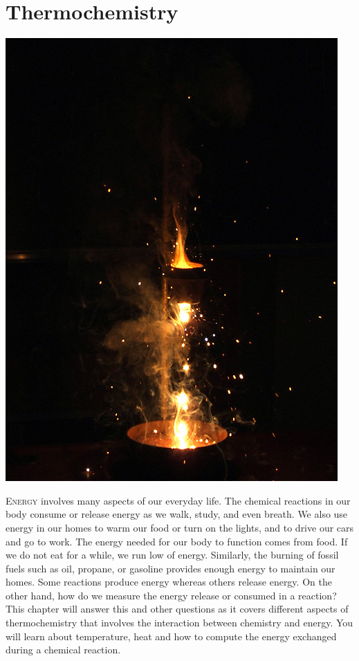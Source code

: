 \documentclass[main.tex]{subfiles}
\begin{document}
\linenumbers



\chapter[Thermochemistry]{Thermochemistry}
\label{ch:energy}

\begin{marginfigure}
      \includegraphics{chapter2/figure1}
   \end{marginfigure}
\lettrine[lines=4]{\color{black!45}E}{nergy}  involves many aspects of our everyday life. The chemical reactions in our body consume or release energy as we walk, study, and even breath. We also use energy in our homes to warm our food or turn on the lights, and to drive our cars and go to work. The energy needed for our body to function comes from food. If we do not eat for a while, we run low of energy. Similarly, the burning of fossil fuels such as oil, propane, or gasoline provides enough energy to maintain our homes. Some reactions produce energy whereas others release energy. On the other hand, how do we measure the energy release or consumed in a reaction? This chapter will answer this and other questions as it covers different aspects of thermochemistry that involves the interaction between chemistry and energy. You will learn about temperature, heat and how to compute the energy exchanged during a chemical reaction.
\end{document}
